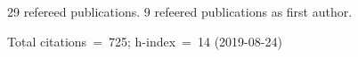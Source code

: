 29 refereed publications. 9 refeered publications as first author.

Total citations~=~725; h-index~=~14 (2019-08-24)
